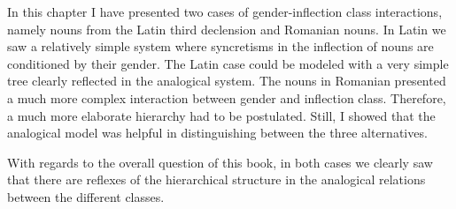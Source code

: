 In this chapter I have presented two cases of gender-inflection class interactions, namely nouns from the Latin third declension and Romanian nouns. In Latin we saw a relatively simple system where syncretisms in the inflection of nouns are conditioned by their gender. The Latin case could be modeled with a very simple tree clearly reflected in the analogical system. The nouns in Romanian presented a much more complex interaction between gender and inflection class. Therefore, a much more elaborate hierarchy had to be postulated. Still, I showed that the analogical model was helpful in distinguishing between the three alternatives.

With regards to the overall question of this book, in both cases we clearly saw that there are reflexes of the hierarchical structure in the analogical relations between the different classes.

